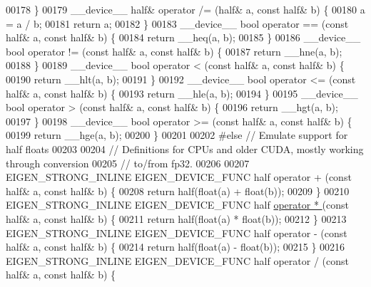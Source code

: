 \begin{DoxyCode}
00178 \}
00179 \_\_device\_\_ half& operator /= (half& a, \textcolor{keyword}{const} half& b) \{
00180   a = a / b;
00181   \textcolor{keywordflow}{return} a;
00182 \}
00183 \_\_device\_\_ \textcolor{keywordtype}{bool} operator == (\textcolor{keyword}{const} half& a, \textcolor{keyword}{const} half& b) \{
00184   \textcolor{keywordflow}{return} \_\_heq(a, b);
00185 \}
00186 \_\_device\_\_ \textcolor{keywordtype}{bool} operator != (\textcolor{keyword}{const} half& a, \textcolor{keyword}{const} half& b) \{
00187   \textcolor{keywordflow}{return} \_\_hne(a, b);
00188 \}
00189 \_\_device\_\_ \textcolor{keywordtype}{bool} operator < (\textcolor{keyword}{const} half& a, \textcolor{keyword}{const} half& b) \{
00190   \textcolor{keywordflow}{return} \_\_hlt(a, b);
00191 \}
00192 \_\_device\_\_ \textcolor{keywordtype}{bool} operator <= (\textcolor{keyword}{const} half& a, \textcolor{keyword}{const} half& b) \{
00193   \textcolor{keywordflow}{return} \_\_hle(a, b);
00194 \}
00195 \_\_device\_\_ \textcolor{keywordtype}{bool} operator > (\textcolor{keyword}{const} half& a, \textcolor{keyword}{const} half& b) \{
00196   \textcolor{keywordflow}{return} \_\_hgt(a, b);
00197 \}
00198 \_\_device\_\_ \textcolor{keywordtype}{bool} operator >= (\textcolor{keyword}{const} half& a, \textcolor{keyword}{const} half& b) \{
00199   \textcolor{keywordflow}{return} \_\_hge(a, b);
00200 \}
00201 
00202 \textcolor{preprocessor}{#else  // Emulate support for half floats}
00203 
00204 \textcolor{comment}{// Definitions for CPUs and older CUDA, mostly working through conversion}
00205 \textcolor{comment}{// to/from fp32.}
00206 
00207 EIGEN\_STRONG\_INLINE EIGEN\_DEVICE\_FUNC half operator + (\textcolor{keyword}{const} half& a, \textcolor{keyword}{const} half& b) \{
00208   \textcolor{keywordflow}{return} half(\textcolor{keywordtype}{float}(a) + \textcolor{keywordtype}{float}(b));
00209 \}
00210 EIGEN\_STRONG\_INLINE EIGEN\_DEVICE\_FUNC half \hyperlink{namespace_eigen_a32970f7eb62fe31eeefee72d24a046d0}{operator * }(\textcolor{keyword}{const} half& a, \textcolor{keyword}{const} half& b) \{
00211   \textcolor{keywordflow}{return} half(\textcolor{keywordtype}{float}(a) * \textcolor{keywordtype}{float}(b));
00212 \}
00213 EIGEN\_STRONG\_INLINE EIGEN\_DEVICE\_FUNC half operator - (\textcolor{keyword}{const} half& a, \textcolor{keyword}{const} half& b) \{
00214   \textcolor{keywordflow}{return} half(\textcolor{keywordtype}{float}(a) - \textcolor{keywordtype}{float}(b));
00215 \}
00216 EIGEN\_STRONG\_INLINE EIGEN\_DEVICE\_FUNC half operator / (\textcolor{keyword}{const} half& a, \textcolor{keyword}{const} half& b) \{

\end{DoxyCode}
